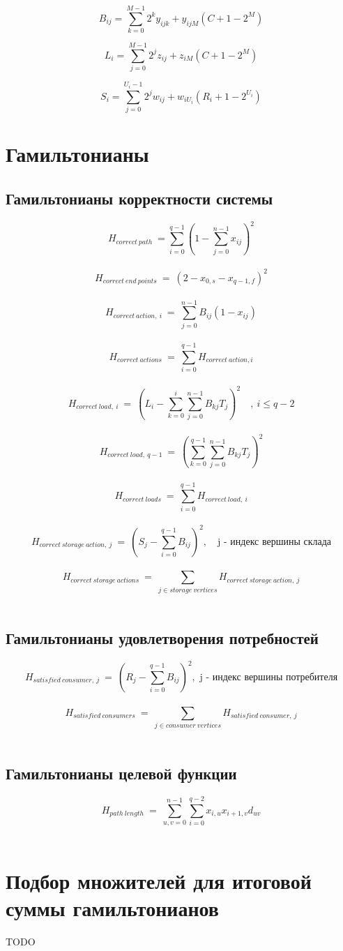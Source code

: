 \documentclass{article}
\begin{document}
\[B_{ij} = \sum_{k=0}^{M-1} 2^ky_{ijk} + y_{ij M} (C + 1 - 2^M)\]

\[L_{i} = \sum_{j=0}^{M-1} 2^j z_{ij} + z_{i M} (C + 1 - 2^M)\]

\[S_{i} = \sum_{j=0}^{U_{i}-1} 2^j w_{ij} + w_{i U_{i}} (R_{i} + 1 - 2^{U_{i}})\]



\section{Гамильтонианы}

\subsection{Гамильтонианы корректности системы}

\[H_{correct \ path} \ = \sum_{i=0}^{q - 1} (1-\sum_{j=0}^{n-1}x_{ij})^2\]\\
\[H_{correct \ end \ points} \ = \ (2 - x_{0,s} -x_{q-1, f})^2 \]\\
\[H_{correct \ action, \ i} \ =\ \sum_{j=0}^{n-1} B_{ij} (1 - x_{ij}) \]\\
\[H_{correct \ actions} \ =\ \sum_{i=0}^{q-1} H_{correct \ action, i} \]\\
\[H_{correct \ load, \ i} \ =\ (L_{i} - \sum_{k=0}^{i}\sum_{j=0}^{n-1} B_{kj} T_{j})^2 \quad, \ i\le q-2\]\\
\[H_{correct \ load, \ q-1} \ =\ (\sum_{k=0}^{q-1}\sum_{j=0}^{n-1} B_{kj} T_{j})^2\]\\
\[H_{correct \ loads} \ =\ \sum_{i=0}^{q-1}H_{correct \ load, \ i}\]\\
\[H_{correct \ storage \ action, \ j } \ =\ (S_{j} - \sum_{i=0}^{q-1} B_{ij} )^2, \quad \text{j - индекс вершины склада}\]\\
\[H_{correct \ storage \ actions} \ =\ \sum_{j \in storage \ vertices} H_{correct \ storage \ action, \ j}\]\\


\subsection{Гамильтонианы удовлетворения потребностей}
\[H_{satisfied \ consumer, \ j } \ =\ (R_{j} - \sum_{i=0}^{q-1} B_{ij} )^2, \text{  j - индекс вершины потребителя}\]\\
\[H_{satisfied \ consumers} \ =\ \sum_{j \in consumer \ vertices} H_{satisfied \ consumer, \ j }\]\\

\subsection{Гамильтонианы целевой функции}
\[H_{path \ length} \ =\ \sum_{u, v = 0}^{n-1} \sum_{i=0}^{q-2}x_{i,u}x_{i+1, v} d_{uv}\]\\

\section{Подбор множителей для итоговой суммы гамильтонианов}
TODO
\end{document}
